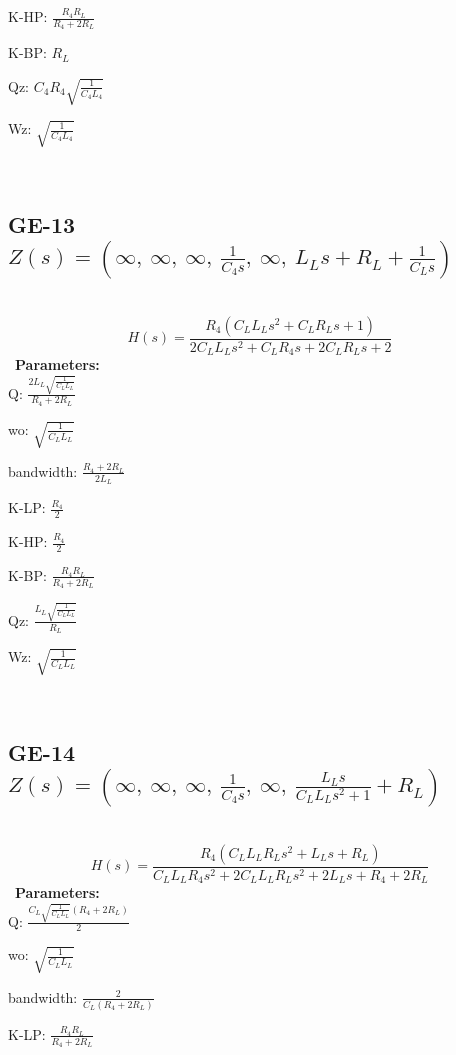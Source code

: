 \documentclass{article}
\begin{document}
K-HP: $\frac{R_{4} R_{L}}{R_{4} + 2 R_{L}}$\ 

K-BP: $R_{L}$\ 

Qz: $C_{4} R_{4} \sqrt{\frac{1}{C_{4} L_{4}}}$\ 

Wz: $\sqrt{\frac{1}{C_{4} L_{4}}}$\ 

\ 

\subsection{GE-13 $Z(s) = \left( \infty, \  \infty, \  \infty, \  \frac{1}{C_{4} s}, \  \infty, \  L_{L} s + R_{L} + \frac{1}{C_{L} s}\right)$ } \ 
\textbf{\[H(s) = \frac{R_{4} \left(C_{L} L_{L} s^{2} + C_{L} R_{L} s + 1\right)}{2 C_{L} L_{L} s^{2} + C_{L} R_{4} s + 2 C_{L} R_{L} s + 2}\] } \ 
\textbf{Parameters:}\\ 

Q: $\frac{2 L_{L} \sqrt{\frac{1}{C_{L} L_{L}}}}{R_{4} + 2 R_{L}}$\ 

wo: $\sqrt{\frac{1}{C_{L} L_{L}}}$\ 

bandwidth: $\frac{R_{4} + 2 R_{L}}{2 L_{L}}$\ 

K-LP: $\frac{R_{4}}{2}$\ 

K-HP: $\frac{R_{4}}{2}$\ 

K-BP: $\frac{R_{4} R_{L}}{R_{4} + 2 R_{L}}$\ 

Qz: $\frac{L_{L} \sqrt{\frac{1}{C_{L} L_{L}}}}{R_{L}}$\ 

Wz: $\sqrt{\frac{1}{C_{L} L_{L}}}$\ 

\ 

\subsection{GE-14 $Z(s) = \left( \infty, \  \infty, \  \infty, \  \frac{1}{C_{4} s}, \  \infty, \  \frac{L_{L} s}{C_{L} L_{L} s^{2} + 1} + R_{L}\right)$ } \ 
\textbf{\[H(s) = \frac{R_{4} \left(C_{L} L_{L} R_{L} s^{2} + L_{L} s + R_{L}\right)}{C_{L} L_{L} R_{4} s^{2} + 2 C_{L} L_{L} R_{L} s^{2} + 2 L_{L} s + R_{4} + 2 R_{L}}\] } \ 
\textbf{Parameters:}\\ 

Q: $\frac{C_{L} \sqrt{\frac{1}{C_{L} L_{L}}} \left(R_{4} + 2 R_{L}\right)}{2}$\ 

wo: $\sqrt{\frac{1}{C_{L} L_{L}}}$\ 

bandwidth: $\frac{2}{C_{L} \left(R_{4} + 2 R_{L}\right)}$\ 

K-LP: $\frac{R_{4} R_{L}}{R_{4} + 2 R_{L}}$\ 
\end{document}
